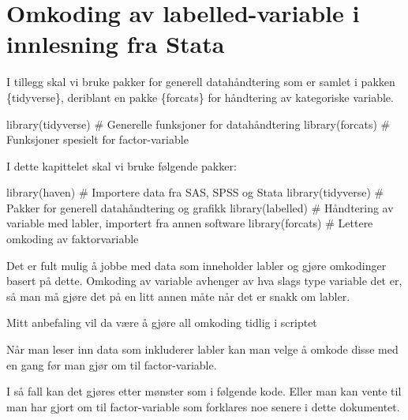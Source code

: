 \documentclass[
  letterpaper,
  DIV=11,
  numbers=noendperiod]{scrreprt}
\newenvironment{Shaded}{\begin{snugshade}}{\end{snugshade}}
\newcommand{\CommentTok}[1]{\textcolor[rgb]{0.37,0.37,0.37}{#1}}
\newcommand{\FunctionTok}[1]{\textcolor[rgb]{0.28,0.35,0.67}{#1}}
\newcommand{\NormalTok}[1]{\textcolor[rgb]{0.00,0.23,0.31}{#1}}
\begin{document}
\hypertarget{omkoding-av-labelled-variable-i-innlesning-fra-stata}{%
\chapter{Omkoding av labelled-variable i innlesning fra
Stata}\label{omkoding-av-labelled-variable-i-innlesning-fra-stata}}

I tillegg skal vi bruke pakker for generell datahåndtering som er samlet
i pakken \{tidyverse\}, deriblant en pakke \{forcats\} for håndtering av
kategoriske variable.

\begin{Shaded}
\begin{Highlighting}[]
\FunctionTok{library}\NormalTok{(tidyverse)   }\CommentTok{\# Generelle funksjoner for datahåndtering}
\FunctionTok{library}\NormalTok{(forcats)     }\CommentTok{\# Funksjoner spesielt for factor{-}variable}
\end{Highlighting}
\end{Shaded}

I dette kapittelet skal vi bruke følgende pakker:

\begin{Shaded}
\begin{Highlighting}[]
\FunctionTok{library}\NormalTok{(haven)       }\CommentTok{\# Importere data fra SAS, SPSS og Stata}
\FunctionTok{library}\NormalTok{(tidyverse)   }\CommentTok{\# Pakker for generell datahåndtering og grafikk}
\FunctionTok{library}\NormalTok{(labelled)    }\CommentTok{\# Håndtering av variable med labler, importert fra annen software}
\FunctionTok{library}\NormalTok{(forcats)     }\CommentTok{\# Lettere omkoding av faktorvariable}
\end{Highlighting}
\end{Shaded}

Det er fult mulig å jobbe med data som inneholder labler og gjøre
omkodinger basert på dette. Omkoding av variable avhenger av hva slags
type variable det er, så man må gjøre det på en litt annen måte når det
er snakk om labler.

Mitt anbefaling vil da være å gjøre all omkoding tidlig i scriptet

Når man leser inn data som inkluderer labler kan man velge å omkode
disse med en gang før man gjør om til factor-variable.

I så fall kan det gjøres etter mønster som i følgende kode. Eller man
kan vente til man har gjort om til factor-variable som forklares noe
senere i dette dokumentet.
\end{document}
